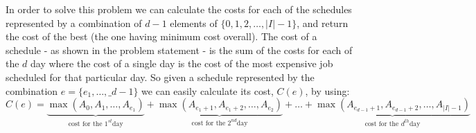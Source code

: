 In order to solve this problem we can calculate the costs for each of the schedules represented by a
combination of $d-1$ elements of $\{0,1,2, \ldots, |I|-1\}$, and return the cost of the best (the
one having minimum cost overall). The cost of a schedule - as shown in the problem statement -  is the
sum of the costs for each of the $d$ day where the cost of a single day is the cost of the most
expensive job scheduled for that particular day. So given a schedule represented by the combination
$e = \{e_1, \ldots, \_{d-1}\}$ we can easily calculate its cost, $C(e)$, by using:
\begin{equation}
    C(e) = \underbrace{\max(A_0, A_1, \ldots, A_{e_1})}_{\text{cost for the } 1^{st} \text{day}} + \underbrace{\max(A_{e_1+1}, A_{e_1+2}, \ldots, A_{e_2})}_{\text{cost for the } 2^{nd} \text{day}} + \ldots + \underbrace{\max(A_{e_{d-1}+1}, A_{e_{d-1}+2}, \ldots, A_{|I|-1})}_{\text{cost for the } d^{th} \text{day}}
    \label{eq:min_difficulty_job_scheduler:cost_combination}
\end{equation}


